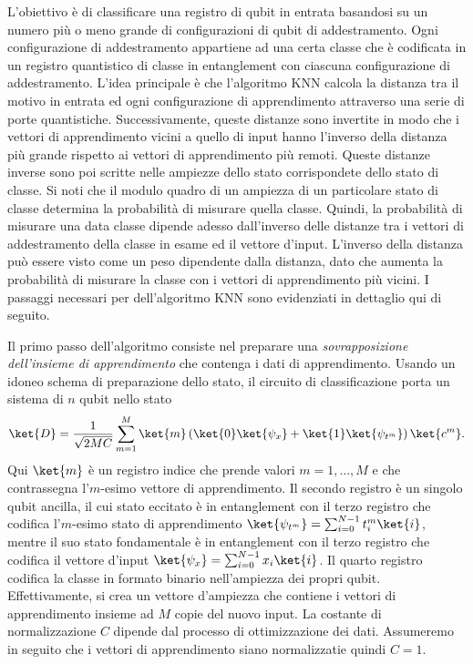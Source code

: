 
L'obiettivo è di classificare una registro di qubit in entrata basandosi 
su un numero più o meno grande di configurazioni di qubit di addestramento. 
Ogni configurazione di addestramento appartiene ad una certa classe che è 
codificata in un registro quantistico di classe in entanglement con ciascuna 
configurazione di addestramento. L'idea principale è che l'algoritmo \ac{KNN} 
calcola la distanza tra il motivo in entrata ed ogni configurazione di 
apprendimento attraverso una serie di porte quantistiche. 
Successivamente, queste distanze sono invertite in modo che i vettori di 
apprendimento vicini a quello di input hanno l'inverso della distanza più 
grande rispetto ai vettori di apprendimento più remoti. Queste distanze inverse 
sono poi scritte nelle ampiezze dello stato corrispondete dello stato di classe. 
Si noti che il modulo quadro di un ampiezza di un particolare stato di classe 
determina la probabilità di misurare quella classe. 
Quindi, la probabilità di misurare una data classe dipende adesso dall'inverso 
delle distanze tra i vettori di addestramento della classe in esame ed il 
vettore d'input. L'inverso della distanza può essere visto come un peso 
dipendente dalla distanza, dato che aumenta la probabilità di misurare la 
classe con i vettori di apprendimento più vicini. 
I passaggi necessari per dell'algoritmo \ac{KNN} sono evidenziati in dettaglio 
qui di seguito. 

Il primo passo dell'algoritmo consiste nel preparare una 
\emph{sovrapposizione dell'insieme di apprendimento} che 
contenga i dati di apprendimento. 
Usando un idoneo schema di preparazione dello stato, 
il circuito di classificazione porta un sistema di $n$ 
qubit nello stato 
\begin{equation}
    \ket{D} = \frac{1}{\sqrt{2MC}} \sum_{m=1}^M \ket{m} 
    \left( \ket{0}\ket{\psi_x} + \ket{1}\ket{\psi_{t^m}} \right)
    \ket{c^m}.
\end{equation}
Qui $\ket{m}$ è un registro indice che prende valori 
$m=1,\ldots,M$ e che contrassegna l'$m$-esimo vettore 
di apprendimento. 
Il secondo registro è un singolo qubit ancilla, il cui 
stato eccitato è in entanglement con il terzo registro 
che codifica l'$m$-esimo stato di apprendimento 
$\ket{\psi_{t^m}} = \sum_{i=0}^{N-1} t_i^m \ket{i}$, 
mentre il suo stato fondamentale è in entanglement con 
il terzo registro che codifica il vettore d'input 
$\ket{\psi_x} = \sum_{i=0}^{N-1} x_i \ket{i}$. 
Il quarto registro codifica la classe in formato binario 
nell'ampiezza dei propri qubit. 
Effettivamente, si crea un vettore d'ampiezza che contiene 
i vettori di apprendimento insieme ad $M$ copie del nuovo 
input. La costante di normalizzazione $C$ dipende dal 
processo di ottimizzazione dei dati. 
Assumeremo in seguito che i vettori di apprendimento siano 
normalizzatie quindi $C=1$. 

